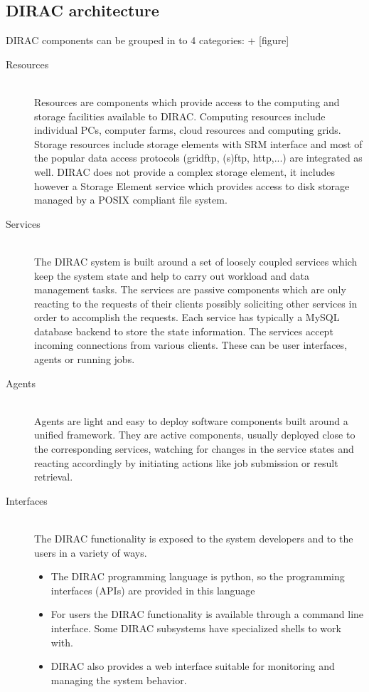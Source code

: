 \subsection{DIRAC architecture}
DIRAC components can be grouped in to 4 categories: + [figure] %
\begin{description}

\item[Resources] \hfill \\
Resources are components which provide access to the computing and storage facilities available to
DIRAC. Computing resources include individual PCs, computer farms, cloud resources and computing grids. Storage 
resources include storage elements with SRM interface and most of the popular data access protocols (gridftp,
(s)ftp, http,...) are integrated as well. DIRAC does not provide a complex storage element, it includes however a 
Storage Element service which provides access to disk storage managed by a POSIX compliant file system.

\item[Services] \hfill \\
The DIRAC system is built around a set of loosely coupled services which keep the system state and
help to carry out workload and data management tasks. The services are passive components which
are only reacting to the requests of their clients possibly soliciting other services in order to
accomplish the requests. Each service has typically a MySQL database backend to store the state
information. The services accept incoming connections from various clients. These can be user interfaces,
agents or running jobs. 

\item[Agents] \hfill \\
Agents are light and easy to deploy software components built around a unified framework. They are active
components, usually deployed close to the corresponding services, watching for changes in the service states and 
reacting accordingly by initiating actions like job submission or result retrieval. 

\item[Interfaces] \hfill \\
The DIRAC functionality is exposed to the system developers and to the users in a variety of ways. 
	\begin{itemize}
	\item The DIRAC programming language is python, so the programming interfaces (APIs) are provided in this 		
		language
	\item For users the DIRAC functionality is available through a command line interface. Some DIRAC subsystems 		
		have specialized shells to work with.
	\item DIRAC also provides a web interface suitable for monitoring and managing the system behavior.
	\end{itemize}

\end{description}

